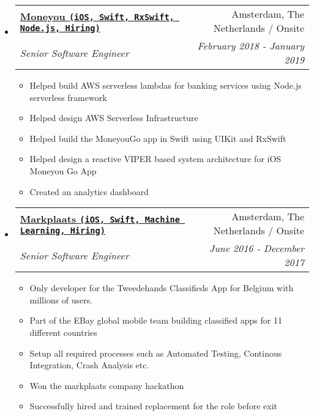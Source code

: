 \documentclass[letterpaper,11pt]{article}
\makeatletter
\newcommand{\resitem}[1]{\item #1 \vspace{-2pt}}
\newcommand{\ressubheading}[4]{
\begin{tabular*}{7.0in}{l@{\extracolsep{\fill}}r}
    \textbf{#1} & #2 \\
    \textit{#3} & \textit{#4} \\
\end{tabular*}\vspace{-6pt}}
\makeatother
\begin{document}
\begin{itemize}
    
\item
    \ressubheading{\href{https://www.moneyou.nl/}{Moneyou \texttt{(iOS, Swift, RxSwift, Node.js, Hiring)}}}{Amsterdam, The Netherlands / Onsite}{Senior Software Engineer}{February 2018 - January 2019}
    \begin{itemize}
        \resitem{Helped build AWS serverless lambdas for banking services using Node.js serverless framework}
        \resitem{Helped design AWS Serverless Infrastructure}
        \resitem{Helped build the MoneyouGo app in Swift using UIKit and RxSwift}
        \resitem{Helped design a reactive VIPER based system architecture for iOS Moneyou Go App}
        \resitem{Created an analytics dashboard}
    \end{itemize}
    
\item
    \ressubheading{\href{https://www.markplaats.nl/}{Markplaats \texttt{(iOS, Swift, Machine Learning, Hiring)}}}{Amsterdam, The Netherlands / Onsite}{Senior Software Engineer}{June 2016 - December 2017}
    \begin{itemize}
        \resitem{Only developer for the Tweedehands Classifieds App for Belgium with millions of users.}
        \resitem{Part of the EBay global mobile team building classified apps for 11 different countries}
        \resitem{Setup all required processes such as Automated Testing, Continous Integration, Crash Analysis etc.}
        \resitem{Won the markplaats company hackathon}
        \resitem{Successfully hired and trained replacement for the role before exit}
    \end{itemize}


\end{itemize}

\vspace{0.2in}
\end{document}
